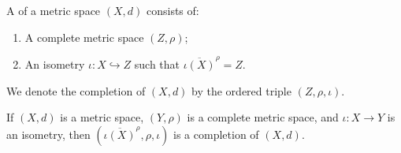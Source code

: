 \documentclass[10pt,oneside,openany]{memoir}
\begin{document}
\begin{abstract}
    Blah blah blah
\end{abstract}

\begin{definition}
    A  of a metric space $(X,d)$ consists of:
        \begin{enumerate}[label = (\arabic*),itemsep=1pt,topsep=3pt]
            \item A complete metric space $(Z,\rho)$;
            \item An isometry $\iota:X \hookrightarrow Z$ such that $\overline{\iota(X)}^\rho = Z$.
        \end{enumerate}
    We denote the completion of $(X,d)$ by the ordered triple $(Z,\rho,\iota)$.
\end{definition}

\begin{lemma}
    If $(X,d)$ is a metric space, $(Y,\rho)$ is a complete metric space, and $\iota:X \rightarrow Y$ is an isometry, then $(\overline{\iota(X)}^\rho, \rho, \iota)$ is a completion of $(X,d)$.
\end{lemma}
\end{document}
